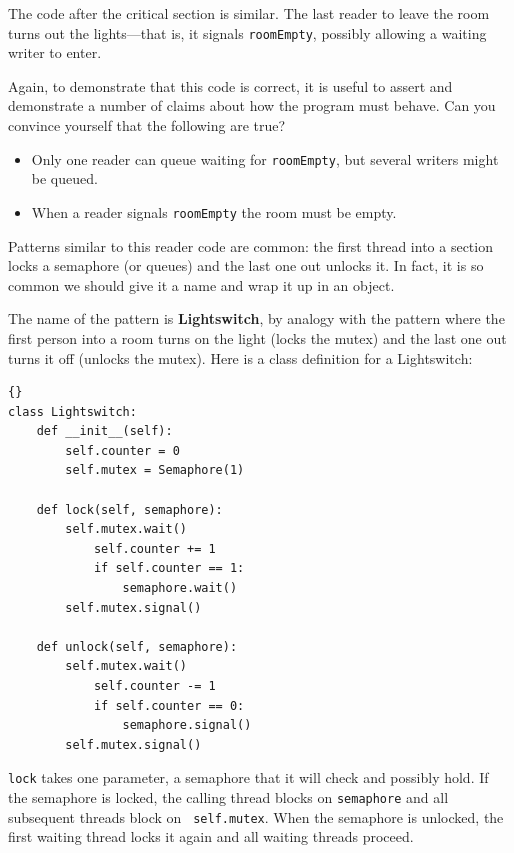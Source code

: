\documentclass{book}
\begin{document}
The code after the critical section is similar.  The last reader
to leave the room turns out the lights---that is, it signals
{\tt roomEmpty}, possibly allowing a waiting writer to enter.

Again, to demonstrate that this code is correct, it is useful
to assert and demonstrate a number of claims about how the program
must behave.  Can you convince yourself that the following are
true?

\begin{itemize}

\item Only one reader can queue waiting for {\tt roomEmpty},
but several writers might be queued.

\item When a reader signals {\tt roomEmpty} the room must
be empty.

\end{itemize}

Patterns similar to this reader code are common: the first thread into
a section locks a semaphore (or queues) and the last one out unlocks
it.  In fact, it is so common we should give it a name and wrap it up
in an object.

The name of the pattern is {\bf Lightswitch}, by analogy with the
pattern where the first person into a room turns on the light (locks
the mutex) and the last one out turns it off (unlocks the mutex).
Here is a class definition for a Lightswitch:

\begin{latin}
\begin{latin}
\begin{lstlisting}[title={Lightswitch definition}]{}
class Lightswitch:
    def __init__(self):
        self.counter = 0
        self.mutex = Semaphore(1)

    def lock(self, semaphore):
        self.mutex.wait()
            self.counter += 1
            if self.counter == 1:
                semaphore.wait()
        self.mutex.signal()

    def unlock(self, semaphore):
        self.mutex.wait()
            self.counter -= 1
            if self.counter == 0:
                semaphore.signal()
        self.mutex.signal()
\end{lstlisting}
\end{latin}
\end{latin}

{\tt lock} takes one parameter, a semaphore that it will check and
possibly hold.  If the semaphore is locked, the calling thread blocks
on {\tt semaphore} and all subsequent threads block on {\tt
self.mutex}.  When the semaphore is unlocked, the first waiting thread
locks it again and all waiting threads proceed.
\end{document}
